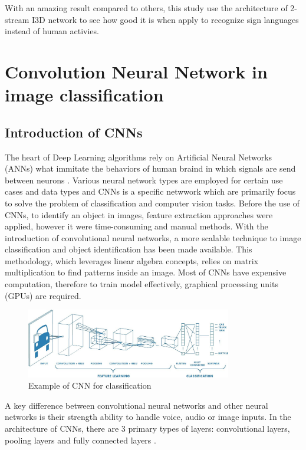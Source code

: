 \documentclass[a4paper, 12pt]{article}
\begin{document}
With an amazing result compared to others, this study use the architecture of 2-stream I3D network to see how good it is when apply to recognize sign languages instead of human activies.

\section{Convolution Neural Network in image classification}
\subsection{Introduction of CNNs}
The heart of Deep Learning algorithms rely on Artificial Neural Networks (ANNs) what immitate the behaviors of human braind in which signals are send between neurons \citep{ibmANN}. Various neural network types are employed for certain use cases and data types and CNNs is a specific netwwork which are primarily focus to solve the problem of classification and computer vision tasks. Before the use of CNNs, to identify an object in images, feature extraction approaches were applied, however it were time-consuming and manual methods. With the introduction of convolutional neural networks, a more scalable technique to image classification and object identification has been made available. This methodology, which leverages linear algebra concepts, relies on matrix multiplication to find patterns inside an image. Most of CNNs have expensive computation, therefore to train model effectively, graphical processing units (GPUs) are required.

\begin{figure}[H]
    \centering
    \includegraphics[width=0.8\textwidth]{Example of Classification by using CNN.jpeg}
    \caption{Example of CNN for classification}
    \label{Figure}
\end{figure}

A key difference between convolutional neural networks and other neural networks is their strength ability to handle voice, audio or image inputs. In the architecture of CNNs, there are 3 primary types of layers:  convolutional layers, pooling layers and fully connected layers \citep{ibmConvNet}.
\end{document}
